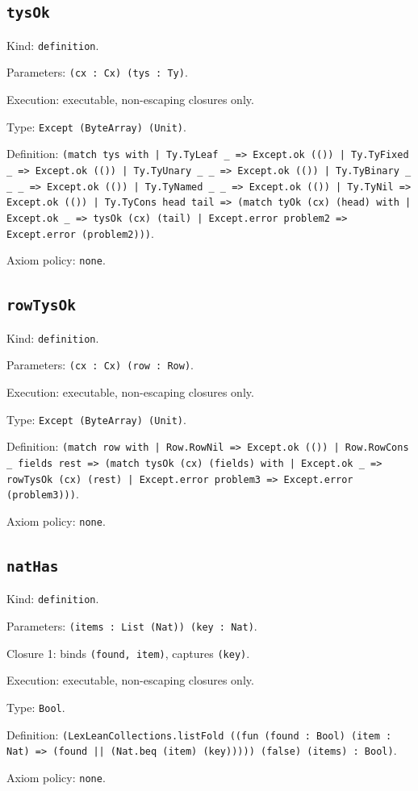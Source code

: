 \documentclass[11pt]{article}
\begin{document}
\subsection*{\texttt{tysOk}}
\noindent Kind: \texttt{definition}.\par
\noindent Parameters: \texttt{(cx : Cx) (tys : Ty)}.\par
\noindent Execution: executable, non-escaping closures only.\par
\noindent Type: \texttt{Except (ByteArray) (Unit)}.\par
\noindent Definition: \texttt{(match tys with | Ty.TyLeaf \_ => Except.ok (()) | Ty.TyFixed \_ => Except.ok (()) | Ty.TyUnary \_ \_ => Except.ok (()) | Ty.TyBinary \_ \_ \_ => Except.ok (()) | Ty.TyNamed \_ \_ => Except.ok (()) | Ty.TyNil => Except.ok (()) | Ty.TyCons head tail => (match tyOk (cx) (head) with | Except.ok \_ => tysOk (cx) (tail) | Except.error problem2 => Except.error (problem2)))}.\par
\noindent Axiom policy: \texttt{none}.\par
\subsection*{\texttt{rowTysOk}}
\noindent Kind: \texttt{definition}.\par
\noindent Parameters: \texttt{(cx : Cx) (row : Row)}.\par
\noindent Execution: executable, non-escaping closures only.\par
\noindent Type: \texttt{Except (ByteArray) (Unit)}.\par
\noindent Definition: \texttt{(match row with | Row.RowNil => Except.ok (()) | Row.RowCons \_ fields rest => (match tysOk (cx) (fields) with | Except.ok \_ => rowTysOk (cx) (rest) | Except.error problem3 => Except.error (problem3)))}.\par
\noindent Axiom policy: \texttt{none}.\par
\subsection*{\texttt{natHas}}
\noindent Kind: \texttt{definition}.\par
\noindent Parameters: \texttt{(items : List (Nat)) (key : Nat)}.\par
\noindent Closure 1: binds \texttt{(found, item)}, captures \texttt{(key)}.\par
\noindent Execution: executable, non-escaping closures only.\par
\noindent Type: \texttt{Bool}.\par
\noindent Definition: \texttt{(LexLeanCollections.listFold ((fun (found : Bool) (item : Nat) => (found || (Nat.beq (item) (key))))) (false) (items) : Bool)}.\par
\noindent Axiom policy: \texttt{none}.\par
\end{document}
